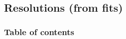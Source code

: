\documentclass[8pt]{beamer}
\begin{document}
%      
%     
%      
%      
%     
%      
 
 \subsection{Resolutions (from fits)}

\begin{frame}
 \frametitle{Table of contents}
 
\end{frame}
 
\end{document}
